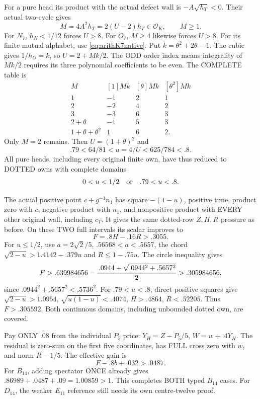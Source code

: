 For a pure head its product with the actual defect
wall is \(-A\sqrt{h_T}<0\).
Their actual two-cycle gives
\[
              M=4A^2h_T=2(U-2)h_T\in\mathcal O_K,\qquad M\ge1 .
\]
For \(N_7\), \(h_N<1/12\) forces \(U>8\).
For \(O_7\), \(M\ge4\) likewise forces \(U>8\).
For its finite mutual alphabet, use
\eqref{eq:arithK7native}.
Put \(k=\theta^2+2\theta-1\).
The cubic gives \(1/h_O=k\), so \(U=2+Mk/2\).
The ODD order index means integrality of \(Mk/2\)
requires its three polynomial coefficients to be even.
The COMPLETE table is
\[
\begin{array}{c|rrr}
 M&[1]Mk&[\theta]Mk&[\theta^2]Mk\\ \hline
 1&-1&2&1\\
 2&-2&4&2\\
 3&-3&6&3\\
 2+\theta&-1&5&3\\
 1+\theta+\theta^2&1&6&2 .
\end{array}
\]
Only \(M=2\) remains.
Then \(U=(1+\theta)^2\) and
\[
             .79<64/81<u=4/U<625/784<.8 .
\]
All pure heads, including every original finite own,
have thus reduced to DOTTED owns with complete domains
\[
                            0<u<1/2
                   \quad\hbox{or}\quad .79<u<.8 .
\]

The actual positive point \(c+g^{-1}n_1\) has square
\(-(1-u)\), positive time, product zero with \(c\),
negative product with \(n_1\), and nonpositive product
with EVERY other original wall, including \(c_T\).
It gives the same dotted-row \(Z,H,R\) pressure as before.
On these TWO full intervals its scalar improves to
\[
                             F=.8H-.16R>.3055 .
\]
For \(u\le1/2\), use \(a=2\sqrt2/5\),
\(.56568<a<.5657\), the chord
\(\sqrt{2-u}>1.4142-.379u\) and \(R\le1-.75u\).
The circle inequality gives
\[
 F>.639984656-
       {\, .0944+\sqrt{.0944^2+.5657^2}\over2}
       >.305984656,
\]
since \(.0944^2+.5657^2<.5736^2\).
For \(.79<u<.8\), direct positive squares give
\(\sqrt{2-u}>1.0954\),
\(\sqrt{u(1-u)}<.4074\),
\(H>.4864\), \(R<.52205\).
Thus \(F>.305592\).
Both continuous domains, including unbounded dotted
own, are covered.

Pay ONLY \(.08\) from the individual \(P_5\) price:
\(Y_H=Z-P_5/5\), \(W=w+.4Y_H\).
The residual is zero-sum on the first five coordinates,
has FULL cross zero with \(w\), and norm \(R-1/5\).
The effective gain is
\[
                        F-.8b+.032>.0487 .
\tag{TG}\label{eq:arithBD14typedgain}
\]
For \(B_{14}\), adding spectator ONCE already gives
\(.86989+.0487+.09=1.00859>1\).
This completes BOTH typed \(B_{14}\) cases.
For \(D_{14}\), the weaker \(E_{11}\) reference
still needs its own centre-twelve proof.

